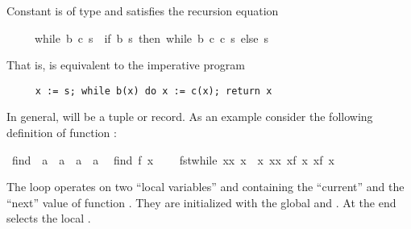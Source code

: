 \begin{isabellebody}
\begin{isamarkuptext}
Constant  is of type 
and satisfies the recursion equation \begin{isabelle}%
\ \ \ \ \ while\ b\ c\ s\ {\isacharequal}\ {\isacharparenleft}if\ b\ s\ then\ while\ b\ c\ {\isacharparenleft}c\ s{\isacharparenright}\ else\ s{\isacharparenright}%
\end{isabelle}
That is,  is equivalent to the imperative program
\begin{verbatim}
     x := s; while b(x) do x := c(x); return x
\end{verbatim}
In general,  will be a tuple or record.  As an example
consider the following definition of function :%
\end{isamarkuptext}%
\isamarkuptrue%
\isamarkupfalse%
\ find{}\ {\isacharcolon}{\isacharcolon}\ {\isachardoublequoteopen}{\isacharparenleft}{\isacharprime}a\ {\isasymRightarrow}\ {\isacharprime}a{\isacharparenright}\ {\isasymRightarrow}\ {\isacharprime}a\ {\isasymRightarrow}\ {\isacharprime}a{\isachardoublequoteclose}\isanewline
\ \ {\isachardoublequoteopen}find{}\ f\ x\ {\isasymequiv}\isanewline
\ \ \ fst{\isacharparenleft}while\ {\isacharparenleft}{\isasymlambda}{\isacharparenleft}x{\isacharcomma}x{\isacharprime}{\isacharparenright}{\isachardot}\ x{\isacharprime}\ {\isasymnoteq}\ x{\isacharparenright}\ {\isacharparenleft}{\isasymlambda}{\isacharparenleft}x{\isacharcomma}x{\isacharprime}{\isacharparenright}{\isachardot}\ {\isacharparenleft}x{\isacharprime}{\isacharcomma}f\ x{\isacharprime}{\isacharparenright}{\isacharparenright}\ {\isacharparenleft}x{\isacharcomma}f\ x{\isacharparenright}{\isacharparenright}{\isachardoublequoteclose}%
\begin{isamarkuptext}%
\noindent
The loop operates on two ``local variables''  and 
containing the ``current'' and the ``next'' value of function .
They are initialized with the global  and . At the
end  selects the local .


\end{isamarkuptext}
\end{isabellebody}
